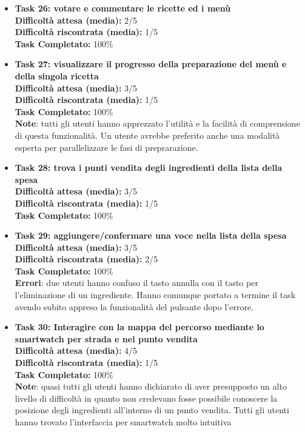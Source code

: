 \begin{itemize}
\item
\textbf{Task 26: votare e commentare le ricette ed i menù}\\
\textbf{Difficoltà attesa (media):} 2/5\\
\textbf{Difficoltà riscontrata (media):} 1/5\\
\textbf{Task Completato:} 100\%\\

\item
\textbf{Task 27: visualizzare il progresso della preparazione del menù e
della singola ricetta}\\
\textbf{Difficoltà attesa (media):} 3/5\\
\textbf{Difficoltà riscontrata (media):} 1/5\\
\textbf{Task Completato:} 100\%\\
\textbf{Note}: tutti gli utenti hanno apprezzato l'utilità e la facilità
di comprensione di questa funzionalità. Un utente avrebbe preferito
anche una modalità esperta per parallelizzare le fasi di preprarazione.

\item
\textbf{Task 28: trova i punti vendita degli ingredienti della lista
della spesa}\\
\textbf{Difficoltà attesa (media):} 3/5\\
\textbf{Difficoltà riscontrata (media):} 1/5\\
\textbf{Task Completato:} 100\%\\

\item
\textbf{Task 29: aggiungere/confermare una voce nella lista della spesa}
\textbf{Difficoltà attesa (media):} 3/5\\
\textbf{Difficoltà riscontrata (media):} 2/5\\
\textbf{Task Completato:} 100\%\\
\textbf{Errori}: due utenti hanno confuso il tasto annulla con il tasto per
l'eliminazione di un ingrediente. Hanno comunque portato a termine il task
avendo subito appreso la funzionalità del pulsante dopo l'errore.

\item
\textbf{Task 30: Interagire con la mappa del percorso mediante lo
smartwatch per strada e nel punto vendita}\\
\textbf{Difficoltà attesa (media):} 4/5\\
\textbf{Difficoltà riscontrata (media):} 1/5\\
\textbf{Task Completato:} 100\%\\
\textbf{Note}: quasi tutti gli utenti hanno dichiarato di aver presupposto un alto livello
di difficoltà in quanto non credevano fosse possibile conoscere la
posizione degli ingredienti all'interno di un punto vendita. Tutti gli
utenti hanno trovato l'interfaccia per smartwatch molto intuitiva


\end{itemize}
